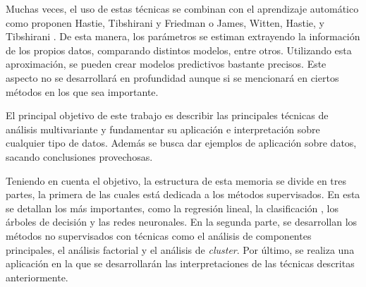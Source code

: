\noindent Muchas veces, el uso de estas técnicas se combinan con el aprendizaje automático como proponen Hastie, Tibshirani y Friedman \cite{Hastie 2001} o  James, Witten, Hastie, y  Tibshirani \cite{James 2013}. De esta manera, los parámetros se estiman extrayendo la información de los propios datos, comparando distintos modelos, entre otros. Utilizando esta aproximación, se pueden crear modelos predictivos bastante precisos. Este aspecto no se desarrollará en profundidad aunque si se mencionará en ciertos métodos en los que sea importante. 

\noindent El principal objetivo de este trabajo es describir las principales técnicas de análisis  multivariante y fundamentar su aplicación e interpretación sobre cualquier tipo de datos. Además se busca dar ejemplos de aplicación sobre datos, sacando conclusiones provechosas.

\noindent Teniendo en cuenta el objetivo, la estructura de esta memoria se divide en tres partes, la primera de las cuales está dedicada a los métodos supervisados. En esta se detallan los más importantes, como la regresión lineal, la clasificación , los árboles de decisión  y las redes neuronales. En la segunda parte, se desarrollan los métodos no supervisados con técnicas como el análisis de componentes principales, el análisis factorial y el análisis de \emph{cluster}. Por último, se realiza una aplicación en la que se desarrollarán las interpretaciones de las técnicas descritas anteriormente. 





